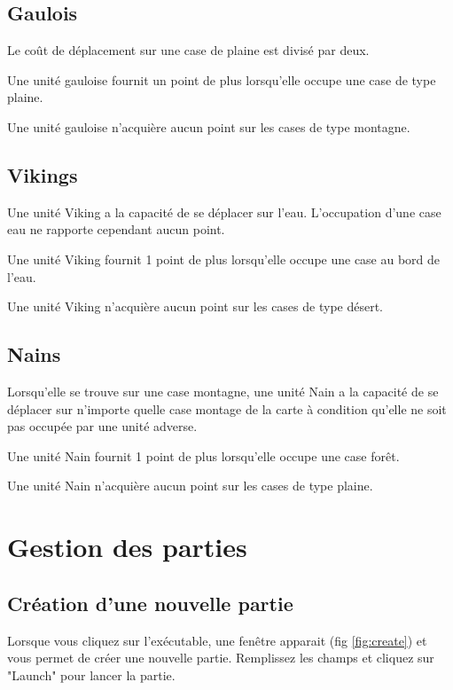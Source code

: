 \documentclass[a4paper,12pt]{article}
\begin{document}
\subsection{Gaulois}
Le coût de déplacement sur une case de plaine est divisé par deux.

Une unité gauloise fournit un point de plus lorsqu'elle occupe une case de type plaine.

Une unité gauloise n'acquière aucun point sur les cases de type montagne.

\subsection{Vikings}
Une unité Viking a la capacité de se déplacer sur l’eau. L’occupation d’une case eau ne
rapporte cependant aucun point.

Une unité Viking fournit 1 point de plus lorsqu’elle occupe une case au bord de l’eau.

Une unité Viking n’acquière aucun point sur les cases de type désert.

\subsection{Nains}
Lorsqu’elle se trouve sur une case montagne, une unité Nain a la capacité de se déplacer
sur n’importe quelle case montage de la carte à condition qu’elle ne soit pas occupée par
une unité adverse.

Une unité Nain fournit 1 point de plus lorsqu’elle occupe une case forêt.

Une unité Nain n’acquière aucun point sur les cases de type plaine.

\section{Gestion des parties}
\subsection{Création d'une nouvelle partie}
Lorsque vous cliquez sur l'exécutable, une fenêtre apparait (fig \ref{fig:create}) et vous permet de créer une nouvelle partie. Remplissez les champs et cliquez sur "Launch" pour lancer la partie.
\end{document}
